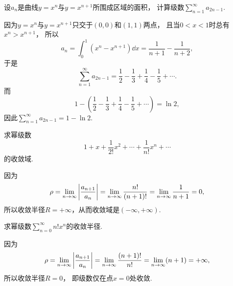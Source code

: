 \begin{example}
设\(a_n\)是曲线\(y=x^n\)与\(y=x^{n+1}\)所围成区域的面积，
计算级数\(\sum_{n=1}^\infty a_{2n-1}\).
\begin{solution}
因为\(y = x^n\)与\(y = x^{n+1}\)只交于\((0,0)\)和\((1,1)\)两点，
且当\(0 < x < 1\)时总有\(x^n > x^{n+1}\)，
所以\begin{equation*}
	a_n = \int_0^1 (x^n - x^{n+1}) \dd{x}
	= \frac1{n+1} - \frac1{n+2},
\end{equation*}
于是\begin{equation*}
	\sum_{n=1}^\infty a_{2n-1}
	= \frac12 - \frac13 + \frac14 - \frac15 + \dotsb.
\end{equation*}
而\begin{equation*}
	1 - \left(\frac12 - \frac13 + \frac14 - \frac15 + \dotsb\right)
	= \ln2,
\end{equation*}
因此\(\sum_{n=1}^\infty a_{2n-1} = 1 - \ln2\).
\end{solution}
\end{example}

\begin{example}
求幂级数\begin{equation*}
	1+x+\frac{1}{2!}x^2+\dotsb+\frac{1}{n!}x^n+\dotsb
\end{equation*}的收敛域.
\begin{solution}
因为\begin{equation*}
	\rho = \lim_{n\to\infty} \abs{\frac{a_{n+1}}{a_n}}
	= \lim_{n\to\infty} \frac{n!}{(n+1)!}
	= \lim_{n\to\infty} \frac{1}{n+1}
	= 0,
\end{equation*}
所以收敛半径\(R = +\infty\)，从而收敛域是\((-\infty,+\infty)\).
\end{solution}
\end{example}

\begin{example}
求幂级数\(\sum_{n=0}^\infty n! x^n\)的收敛半径.
\begin{solution}
因为\begin{equation*}
	\rho
	= \lim_{n\to\infty} \abs{\frac{a_{n+1}}{a_n}}
	= \lim_{n\to\infty} \frac{(n+1)!}{n!}
	= \lim_{n\to\infty} (n+1)
	= +\infty,
\end{equation*}
所以收敛半径\(R = 0\)，
即级数仅在点\(x = 0\)处收敛.
\end{solution}
\end{example}

